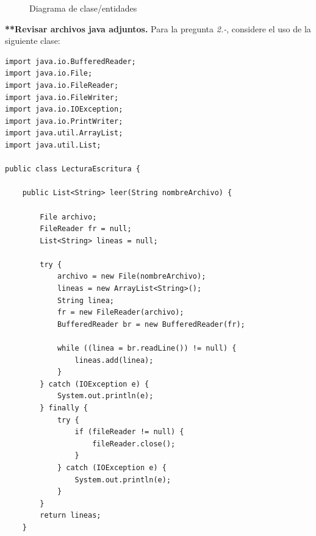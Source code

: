 \documentclass[10pt]{article}
\begin{document}
{    \begin{figure}[htbp!]
        \begin{center}
            \caption{{\scriptsize Diagrama de clase/entidades}}\label{fig:diagrama}
        \end{center}    
    \end{figure}
    \textbf{**Revisar archivos java adjuntos.}
        \newpage
    Para la pregunta \emph{2.-}, considere el uso de la siguiente clase:
        \begin{multicols}{2}
            \begin{verbatim}
import java.io.BufferedReader;
import java.io.File;
import java.io.FileReader;
import java.io.FileWriter;
import java.io.IOException;
import java.io.PrintWriter;
import java.util.ArrayList;
import java.util.List;

public class LecturaEscritura {

    public List<String> leer(String nombreArchivo) {

        File archivo;
        FileReader fr = null;
        List<String> lineas = null;

        try {
            archivo = new File(nombreArchivo);
            lineas = new ArrayList<String>();
            String linea;
            fr = new FileReader(archivo);
            BufferedReader br = new BufferedReader(fr);

            while ((linea = br.readLine()) != null) {
                lineas.add(linea);
            }
        } catch (IOException e) {
            System.out.println(e);
        } finally {
            try {
                if (fileReader != null) {
                    fileReader.close();
                }
            } catch (IOException e) {
                System.out.println(e);
            }
        }
        return lineas;
    }


\end{verbatim}
\end{multicols}}
\end{document}
